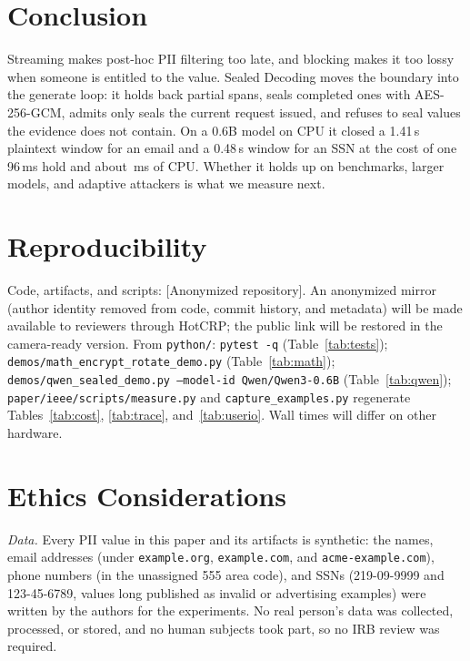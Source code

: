 \documentclass[conference,compsoc]{IEEEtran}
\newcommand{\code}[1]{\texttt{#1}}
\begin{document}
\section{Conclusion}

Streaming makes post-hoc PII filtering too late, and blocking makes it too lossy when someone is entitled to the value. Sealed Decoding moves the boundary into the generate loop: it holds back partial spans, seals completed ones with AES-256-GCM, admits only seals the current request issued, and refuses to seal values the evidence does not contain. On a 0.6B model on CPU it closed a 1.41\,s plaintext window for an email and a 0.48\,s window for an SSN at the cost of one 96\,ms hold and about \mhookMs\,ms of CPU. Whether it holds up on benchmarks, larger models, and adaptive attackers is what we measure next.

\section*{Reproducibility}
Code, artifacts, and scripts: [Anonymized repository]. An anonymized mirror (author identity removed from code, commit history, and metadata) will be made available to reviewers through HotCRP; the public link will be restored in the camera-ready version. From \code{python/}: \code{pytest -q} (Table~\ref{tab:tests}); \code{demos/math\_encrypt\_rotate\_demo.py} (Table~\ref{tab:math}); \code{demos/qwen\_sealed\_demo.py --model-id Qwen/Qwen3-0.6B} (Table~\ref{tab:qwen}); \code{paper/ieee/scripts/measure.py} and \code{capture\_examples.py} regenerate Tables~\ref{tab:cost}, \ref{tab:trace}, and~\ref{tab:userio}. Wall times will differ on other hardware.




\appendices

\section{Ethics Considerations}
\label{app:ethics}

\textit{Data.} Every PII value in this paper and its artifacts is synthetic: the names, email addresses (under \code{example.org}, \code{example.com}, and \code{acme-example.com}), phone numbers (in the unassigned 555 area code), and SSNs (219-09-9999 and 123-45-6789, values long published as invalid or advertising examples) were written by the authors for the experiments. No real person's data was collected, processed, or stored, and no human subjects took part, so no IRB review was required.
\end{document}
